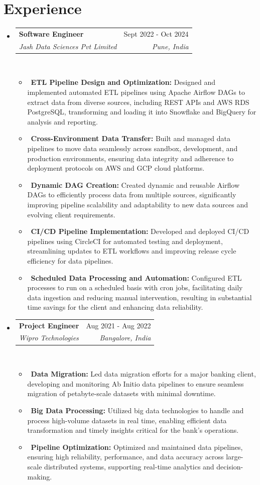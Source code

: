 \documentclass[letterpaper,10.99pt]{article}
\makeatletter
\newcommand{\resumeItem}[1]{\item\small{#1}}
\newcommand{\resumeSubheading}[4]{
\vspace{-1pt}\item
\begin{tabular*}{0.97\textwidth}[t]{l@{\extracolsep{\fill}}r}
\textbf{#1} & #2 \\
\textit{#3} & \textit{#4} \\
\end{tabular*}\vspace{-7pt}
}
\newcommand{\resumeSubHeadingList}{\begin{itemize}[leftmargin=0.10in, label={}]}
\newcommand{\resumeSubHeadingListEnd}{\end{itemize}}
\makeatother
\begin{document}
\begin{minipage}[t]{0.60\textwidth}

    
\section{Experience}
\resumeSubHeadingList
\resumeSubheading
{Software Engineer}{Sept 2022 - Oct 2024}
{Jash Data Sciences Pvt Limited}{Pune, India}\\
\resumeSubHeadingList
\resumeItem{\textbullet\ \textbf{ETL Pipeline Design and Optimization:} Designed and implemented automated ETL pipelines using Apache Airflow DAGs to 
    extract data from diverse sources, including REST APIs and AWS RDS PostgreSQL, transforming 
    and loading it into Snowflake and BigQuery for analysis and reporting.}
\resumeItem{\textbullet\ \textbf{Cross-Environment Data Transfer:} Built and managed data pipelines to move data 
    seamlessly across sandbox, development, and production environments, ensuring data integrity and 
    adherence to deployment protocols on AWS and GCP cloud platforms.}
\resumeItem{\textbullet\ \textbf{Dynamic DAG Creation:} Created dynamic and reusable Airflow DAGs to 
    efficiently process data from multiple sources, significantly improving pipeline 
    scalability and adaptability to new data sources and evolving client requirements.}
\resumeItem{\textbullet\ \textbf{CI/CD Pipeline Implementation:} Developed and deployed CI/CD pipelines 
    using CircleCI for automated testing and deployment, streamlining updates to ETL workflows and 
    improving release cycle efficiency for data pipelines.}
\resumeItem{\textbullet\ \textbf{Scheduled Data Processing and Automation:} Configured ETL processes to run on a 
            scheduled basis with cron jobs, facilitating daily data ingestion and reducing manual intervention, 
            resulting in substantial time savings for the client and enhancing data reliability.}
\resumeSubHeadingListEnd

\resumeSubheading
{Project Engineer}{Aug 2021 - Aug 2022}
{Wipro Technologies}{Bangalore, India}\\
\resumeSubHeadingList
\resumeItem{\textbullet\ \textbf{Data Migration:} Led data migration efforts 
    for a major banking client, developing and monitoring Ab Initio data pipelines to 
    ensure seamless migration of petabyte-scale datasets with minimal downtime.}
\resumeItem{\textbullet\ \textbf{Big Data Processing:} Utilized big data technologies 
    to handle and process high-volume datasets in real time, enabling efficient data 
    transformation and timely insights critical for the bank’s operations.}
\resumeItem{\textbullet\ \textbf{Pipeline Optimization:} Optimized and maintained data pipelines, 
    ensuring high reliability, performance, and data accuracy across large-scale 
    distributed systems, supporting real-time analytics and decision-making.}
\resumeSubHeadingListEnd
\resumeSubHeadingListEnd
\sectionsep


\end{minipage}
\end{document}
